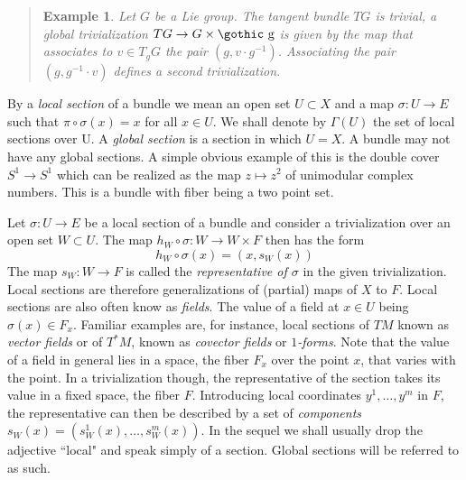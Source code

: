 \documentclass[12pt,titlepage]{article}
\def\goth#1{\hbox{\gothic #1}}
\def\gg{{\goth g}}
\newtheorem{eg}{Example}
\newenvironment{example}{\begin{quote}\begin{eg}}{\end{eg}\end{quote}}
\begin{document}
\begin{example}
Let \(G\) be a Lie group. The tangent bundle \(TG\) is trivial, a
global trivialization \(TG \to G \times \gg\) is given by the map
that associates to \(v\in T_gG\) the pair \((g, v\cdot g^{-1})\).
Associating the pair \((g, g^{-1}\cdot v)\) defines a second
trivialization.
\end{example}

By a {\em local section\/} 
%
 of a bundle we mean an open set \(U\subset X\)
and a map \(\sigma: U \to E\) such that \(\pi\circ\sigma (x) = x\) for
all \(x\in U\).  We shall denote by \(\Gamma(U)\)
%
 the set of local
sections over U. A {\em global section\/}
%
 is a section in which \(U=X\).
A bundle may not have any global sections. A simple obvious 
example of this is
the double cover \(S^1\to S^1\) which can be realized as the map
\(z\mapsto z^2\) of  unimodular complex numbers. 
This is a
bundle with fiber being a two point set. 



Let \(\sigma:U \to E\) be a local section of a bundle and consider a
trivialization over an open set \(W\subset U\). The map \(h_W\circ
\sigma:W\to W\times F\) then has the form 
\begin{equation}\label{eq:locsec}
h_W\circ\sigma(x) = (x, s_W(x))
\end{equation}%
 The map \(s_W:W \to F\) is called the {\em representative of
\(\sigma\)\/} 
%
in the given  trivialization. Local sections are therefore
generalizations of (partial) maps of \(X\) to \(F\).
Local sections are also often know as {\em fields\/}.
%
The value of a field at \(x\in U\) being \(\sigma(x)\in F_x\). Familiar 
examples are, for instance, local
sections of \(TM\) known as {\em vector fields\/} or of \(T^*M\),  known
as {\em covector fields\/} or  {\em \(1\)-forms\/}. 
Note that the value of a field in general lies in
a space, the fiber \(F_x\) over the  point \(x\), that varies 
with the point. 
In a trivialization 
though,
the representative of the section takes its value in a fixed space, the
fiber \(F\). Introducing local coordinates \(y^1,\dots,y^m\) in \(F\), 
the representative  can
then be described by a set of {\em components\/} 
\(s_W(x)= (s^1_W(x),\dots,s^m_W(x))\). In the sequel we shall usually
drop the adjective ``local" and speak simply of a section. Global
sections will be referred to as such. 
\end{document}
